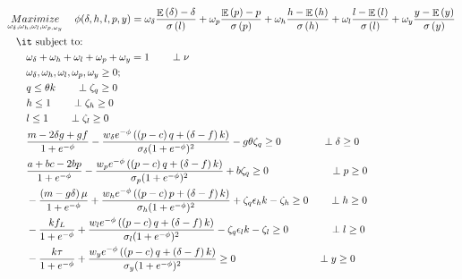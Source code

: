 \documentclass[informs]{informs3}
\begin{document}
\begin{subequations}\label{eqBuyersMPEC}
	\begin{align}
	&\mathop {Maximize}\limits_{\omega_{\delta},\omega_{h},\omega_{l},\omega_{p,\omega_{y}}}
	\quad \phi(\delta, h, l, p, y) =  	 \omega_{\delta}\frac{\mathop{\mathbb{E}}\left(\delta\right)-\delta }
	{\sigma\left(l\right)}+\omega_{p}\frac{\mathop{\mathbb{E}}\left(p\right)-p}  {\sigma\left(p\right)} 
	+\omega_{h}\frac{ h-\mathop{\mathbb{E}}\left(h\right)}
	{\sigma\left(h\right)}+\omega_{l}\frac{ l-\mathop{\mathbb{E}}\left(l\right) }{\sigma\left(l\right)}+\omega_{y}\frac{y-\mathop{\mathbb{E}}\left(y\right)}{\sigma\left(y\right)} \label{eqBuyerObjective}\\
	&\quad \mbox{{\it subject to}:}\notag\\
 	&\qquad	 \omega_{\delta}+\omega_{h}+\omega_{l}+\omega_{p}+\omega_{y}=1\label{eqBuyerNormal} \qquad \perp \nu\\
	&\qquad  \omega_{\delta},\omega_{h},\omega_{l},\omega_{p},\omega_{y} \geq 0;\\
    &\qquad q \leq \theta k	\label{eqBuyerEnergySupply2} 	\qquad \perp \zeta_q\geq 0\\
    &\qquad   h \leq 1 \label{eqGeneratorFinance2}		\qquad \perp \zeta_h\geq 0\\
	&\qquad   l \leq 1 \label{eqGeneratorLocal2}			\qquad \perp \zeta_l\geq 0\\
    & \qquad  \frac{m-2\delta g + g f}{1+e^{-\phi}}-\frac{w_{\delta} e^{-\phi} \left(\left(p-c\right)q +\left(\delta-f\right)k\right)}{\sigma_{\delta}(1+e^{-\phi})^{2}}-g \theta \zeta_q  \geq 0 \qquad\qquad \perp \delta \geq 0\\
    &\qquad \frac{a+bc-2bp}{1+e^{-\phi}}-\frac{w_p e^{-\phi} \left(\left(p-c\right)q+\left(\delta-f\right)k\right)}{\sigma_{p}(1+e^{-\phi})^{2}}+b \zeta_q  \geq 0 \qquad\qquad\qquad \perp p \geq 0\\
    & \qquad -\frac{\left(m-g\delta\right)\mu}{1+e^{-\phi}}+{\frac{w_h e^{-\phi} \left(\left(p-c\right)p +\left(\delta-f\right)k\right)}{\sigma_{h}(1+e^{-\phi})^{2}}}+\zeta_q \epsilon_h k-\zeta_h \geq 0 \qquad \perp h\geq 0\\
    & \qquad -\frac{k f_{L}}{1+e^{-\phi}}+{\frac{w_l e^{-\phi} \left(\left(p-c\right)q  +\left(\delta-f\right)k\right)}{\sigma_{l}(1+e^{-\phi})^{2}}}-\zeta_q \epsilon_l k -\zeta_l \geq 0 \qquad\qquad \perp l\geq 0\\
    &\qquad  -\frac{k\tau}{1+e^{-\phi}}+ {\frac{w_y e^{-\phi} \left(\left(p-c\right)q +\left(\delta-f\right)k\right)}{\sigma_{y}(1+e^{-\phi})^{2}}} \geq 0 \qquad\qquad\qquad\qquad \perp y\geq 0\\  

\end{align}
\end{subequations}
\end{document}
